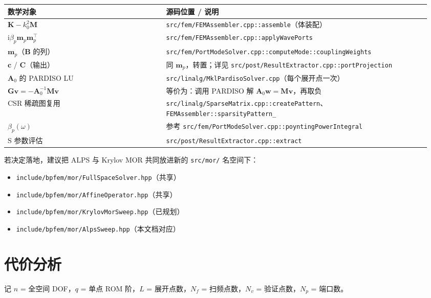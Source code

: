 \documentclass[11pt,a4paper]{ctexart}
\newcommand{\im}{\mathrm{i}}
\begin{document}
\begin{table}[h]
\centering
\begin{tabular}{p{0.36\linewidth}p{0.6\linewidth}}
\toprule
数学对象 & 源码位置 / 说明 \\
\midrule
$\bm K - k_0^2\bm M$ & \texttt{src/fem/FEMAssembler.cpp::assemble}（体装配）\\
$\im\beta_p\bm m_p\bm m_p^{\!\top}$ & \texttt{src/fem/FEMAssembler.cpp::applyWavePorts}\\
$\bm m_p$（$\bm B$ 的列） & \texttt{src/fem/PortModeSolver.cpp::computeMode::couplingWeights}\\
$\bm c$ / $\bm C$（输出） & 同 $\bm m_p$，转置；详见 \texttt{src/post/ResultExtractor.cpp::portProjection}\\
$\bm A_0$ 的 PARDISO LU & \texttt{src/linalg/MklPardisoSolver.cpp}（每个展开点一次）\\
$\bm G\bm v = -\bm A_0^{-1}\bm M\bm v$ & 等价为：调用 PARDISO 解 $\bm A_0\bm w = \bm M\bm v$，再取负\\
CSR 稀疏图复用 & \texttt{src/linalg/SparseMatrix.cpp::createPattern}、\texttt{FEMAssembler::sparsityPattern\_}\\
$\beta_p(\omega)$ & 参考 \texttt{src/fem/PortModeSolver.cpp::poyntingPowerIntegral}\\
S 参数评估 & \texttt{src/post/ResultExtractor.cpp::extract}\\
\bottomrule
\end{tabular}
\end{table}

若决定落地，建议把 ALPS 与 Krylov MOR 共同放进新的 \texttt{src/mor/} 名空间下：

\begin{itemize}
\item \texttt{include/bpfem/mor/FullSpaceSolver.hpp}（共享）
\item \texttt{include/bpfem/mor/AffineOperator.hpp}（共享）
\item \texttt{include/bpfem/mor/KrylovMorSweep.hpp}（已规划）
\item \texttt{include/bpfem/mor/AlpsSweep.hpp}（本文档对应）
\end{itemize}

\section{代价分析}

记 $n$ = 全空间 DOF，$q$ = 单点 ROM 阶，$L$ = 展开点数，$N_f$ = 扫频点数，$N_v$ = 验证点数，$N_p$ = 端口数。
\end{document}
